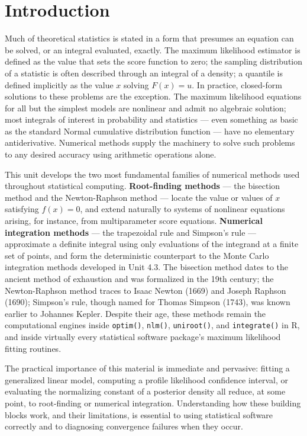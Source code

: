 \documentclass[
]{article}
\begin{document}
\section{Introduction}\label{introduction}

Much of theoretical statistics is stated in a form that presumes an
equation can be solved, or an integral evaluated, exactly. The maximum
likelihood estimator is defined as the value that sets the score
function to zero; the sampling distribution of a statistic is often
described through an integral of a density; a quantile is defined
implicitly as the value \(x\) solving \(F(x)=u\). In practice,
closed-form solutions to these problems are the exception. The maximum
likelihood equations for all but the simplest models are nonlinear and
admit no algebraic solution; most integrals of interest in probability
and statistics --- even something as basic as the standard Normal
cumulative distribution function --- have no elementary antiderivative.
Numerical methods supply the machinery to solve such problems to any
desired accuracy using arithmetic operations alone.

This unit develops the two most fundamental families of numerical
methods used throughout statistical computing. \textbf{Root-finding
methods} --- the bisection method and the Newton-Raphson method ---
locate the value or values of \(x\) satisfying \(f(x)=0\), and extend
naturally to systems of nonlinear equations arising, for instance, from
multiparameter score equations. \textbf{Numerical integration methods}
--- the trapezoidal rule and Simpson's rule --- approximate a definite
integral using only evaluations of the integrand at a finite set of
points, and form the deterministic counterpart to the Monte Carlo
integration methods developed in Unit 4.3. The bisection method dates to
the ancient method of exhaustion and was formalized in the 19th century;
the Newton-Raphson method traces to Isaac Newton (1669) and Joseph
Raphson (1690); Simpson's rule, though named for Thomas Simpson (1743),
was known earlier to Johannes Kepler. Despite their age, these methods
remain the computational engines inside \texttt{optim()},
\texttt{nlm()}, \texttt{uniroot()}, and \texttt{integrate()} in R, and
inside virtually every statistical software package's maximum likelihood
fitting routines.

The practical importance of this material is immediate and pervasive:
fitting a generalized linear model, computing a profile likelihood
confidence interval, or evaluating the normalizing constant of a
posterior density all reduce, at some point, to root-finding or
numerical integration. Understanding how these building blocks work, and
their limitations, is essential to using statistical software correctly
and to diagnosing convergence failures when they occur.
\end{document}
